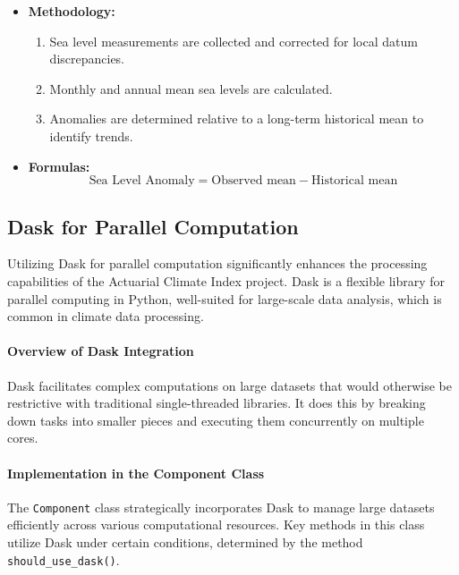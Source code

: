 \documentclass[a4paper,12pt]{article}
\begin{document}
\begin{itemize}
    \item \textbf{Methodology:}
    \begin{enumerate}
        \item Sea level measurements are collected and corrected for local datum discrepancies.
        \item Monthly and annual mean sea levels are calculated.
        \item Anomalies are determined relative to a long-term historical mean to identify trends.
    \end{enumerate}
    \item \textbf{Formulas:}
    \[
    \text{Sea Level Anomaly} = \text{Observed mean} - \text{Historical mean}
    \]
\end{itemize}

\subsection{Dask for Parallel Computation}
\label{sec:dask-parallel-computation}

Utilizing Dask for parallel computation significantly enhances the processing capabilities of the Actuarial Climate Index project. Dask is a flexible library for parallel computing in Python, well-suited for large-scale data analysis, which is common in climate data processing.

\paragraph{Overview of Dask Integration}
Dask facilitates complex computations on large datasets that would otherwise be restrictive with traditional single-threaded libraries. It does this by breaking down tasks into smaller pieces and executing them concurrently on multiple cores.

\paragraph{Implementation in the Component Class}
The \texttt{Component} class strategically incorporates Dask to manage large datasets efficiently across various computational resources. Key methods in this class utilize Dask under certain conditions, determined by the method \texttt{should\_use\_dask()}.
\end{document}
